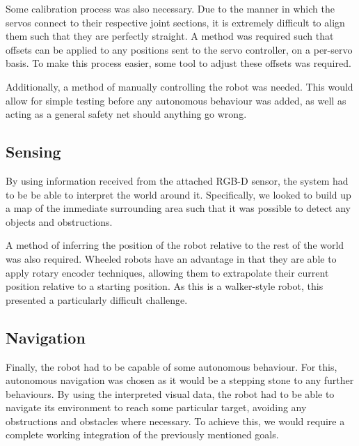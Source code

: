 Some calibration process was also necessary. Due to the manner in which the servos connect to their respective joint sections, it is extremely difficult to align them such that they are perfectly straight. A method was required such that offsets can be applied to any positions sent to the servo controller, on a per-servo basis. To make this process easier, some tool to adjust these offsets was required.

Additionally, a method of manually controlling the robot was needed. This would allow for simple testing before any autonomous behaviour was added, as well as acting as a general safety net should anything go wrong.

\subsection{Sensing}

By using information received from the attached RGB-D sensor, the system had to be be able to interpret the world around it. Specifically, we looked to build up a map of the immediate surrounding area such that it was possible to detect any objects and obstructions.

A method of inferring the position of the robot relative to the rest of the world was also required. Wheeled robots have an advantage in that they are able to apply rotary encoder techniques, allowing them to extrapolate their current position relative to a starting position. As this is a walker-style robot, this presented a particularly difficult challenge.

\subsection{Navigation}

Finally, the robot had to be capable of some autonomous behaviour. For this, autonomous navigation was chosen as it would be a stepping stone to any further behaviours. By using the interpreted visual data, the robot had to be able to navigate its environment to reach some particular target, avoiding any obstructions and obstacles where necessary. To achieve this, we would require a complete working integration of the previously mentioned goals.